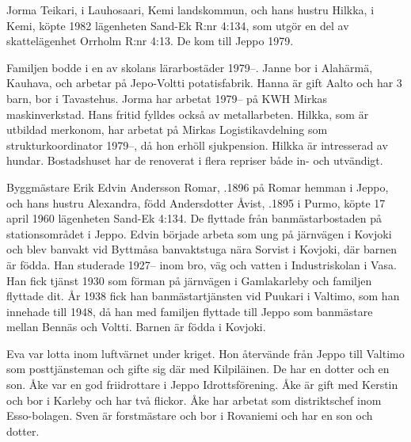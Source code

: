 %
Jorma Teikari,  i Lauhosaari, Kemi landskommun, och hans 	hustru Hilkka,  i Kemi, köpte 1982 lägenheten Sand-Ek R:nr 4:134, som utgör en del av skattelägenhet Orrholm R:nr 4:13. De kom till Jeppo 1979.
\begin{jhchildren}
  \item {}
  \item {}
\end{jhchildren}
Familjen bodde i en av skolans lärarbostäder 1979--.	Janne bor i Alahärmä, Kauhava, och arbetar på Jepo-Voltti potatisfabrik. Hanna är gift Aalto och har 3 barn, bor i Tavastehus. Jorma har arbetat 1979-- på KWH Mirkas maskinverkstad. Hans fritid fylldes också av metallarbeten. Hilkka, som är utbildad merkonom, har arbetat på Mirkas Logistikavdelning som strukturkoordinator	1979--, då hon erhöll sjukpension. Hilkka är intresserad av hundar. Bostadshuset har de renoverat i flera repriser både in- och utvändigt.


%
Byggmästare Erik Edvin Andersson Romar, .1896 på Romar hemman i Jeppo, och hans hustru Alexandra, född Andersdotter Åvist, .1895 i Purmo, köpte 17 april 1960 lägenheten Sand-Ek 4:134. De flyttade från banmästarbostaden på stationsområdet i Jeppo. Edvin började arbeta som ung på järnvägen i Kovjoki och blev banvakt vid Byttmåsa banvaktstuga nära Sorvist i Kovjoki, där barnen är födda. Han studerade 1927-- inom bro, väg och vatten i Industriskolan i Vasa. Han fick tjänst 1930 som förman på järnvägen i Gamlakarleby och familjen flyttade dit. År 1938 fick han banmästartjänsten vid Puukari i Valtimo, som han innehade till 1948, då han med familjen flyttade till Jeppo som banmästare mellan Bennäs och Voltti. Barnen är födda i Kovjoki.
\begin{jhchildren}
  \item {}
  \item {}
  \item {}
  \item {}
\end{jhchildren}
Eva var lotta inom luftvärnet under kriget. Hon återvände från Jeppo till Valtimo som posttjänsteman och gifte sig där med Kilpiläinen. De har en dotter och en son. Åke var en god friidrottare i Jeppo Idrottsförening. Åke är gift med Kerstin och bor i Karleby och har två flickor. Åke har arbetat som distriktschef inom Esso-bolagen. Sven är forstmästare och bor i Rovaniemi och har en son och dotter.

